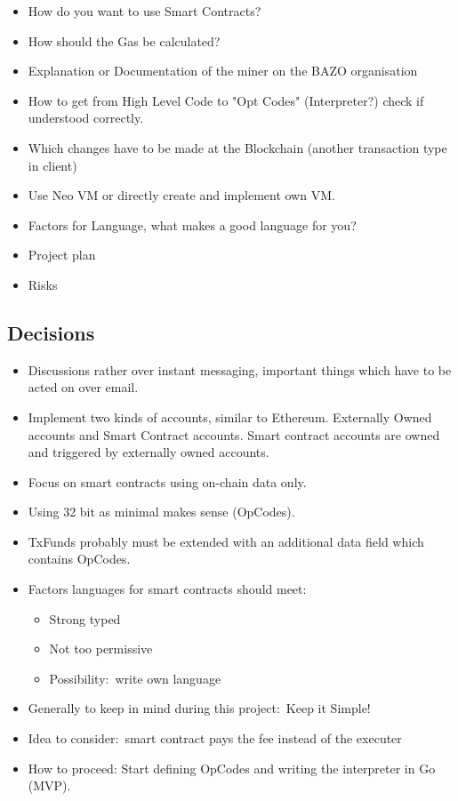 \begin{itemize}
\item
  How do you want to use Smart Contracts?
\item
  How should the Gas be calculated?
\item
  Explanation or Documentation of the miner on the BAZO organisation
\item
  How to get from High Level Code to "Opt Codes" (Interpreter?) check if
  understood correctly.
\item
  Which changes have to be made at the Blockchain (another transaction
  type in client)
\item
  Use Neo VM or directly create and implement own VM.
\item
  Factors for Language, what makes a good language for you?
\item
  Project plan
\item
  Risks
\end{itemize}

\subsection{Decisions}

\begin{itemize}
\item
  Discussions rather over instant messaging, important things which have
  to be acted on over email.
\item
  Implement two kinds of accounts, similar to Ethereum. Externally Owned
  accounts and Smart Contract accounts. Smart contract accounts are
  owned and triggered by externally owned accounts.
\item
  Focus on smart contracts using on-chain data only.
\item
  Using 32 bit as minimal makes sense (OpCodes).
\item
  TxFunds probably must be extended with an additional data field which
  contains OpCodes.
\item
  Factors languages for smart contracts should meet:

  \begin{itemize}
  \item
    Strong typed
  \item
    Not too permissive
  \item
    Possibility:~write own language
  \end{itemize}
\item
  Generally to keep in mind during this project:~Keep it Simple!
\item
  Idea to consider:~smart contract pays the fee instead of the executer
\item
  How to proceed: Start defining OpCodes and writing the interpreter in
  Go (MVP).
\end{itemize}

